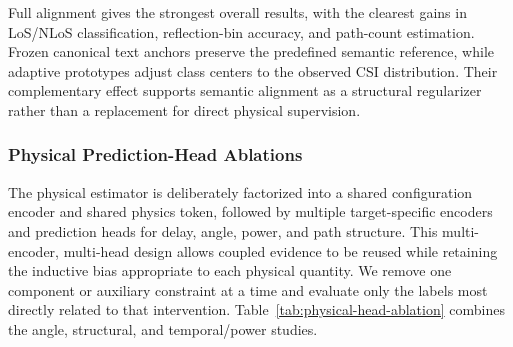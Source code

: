 Full alignment gives the strongest overall results, with the clearest gains in LoS/NLoS
classification, reflection-bin accuracy, and path-count estimation. Frozen canonical text anchors
preserve the predefined semantic reference, while adaptive prototypes adjust class centers to the
observed CSI distribution. Their complementary effect supports semantic alignment as a structural
regularizer rather than a replacement for direct physical supervision.

\subsubsection{Physical Prediction-Head Ablations}

The physical estimator is deliberately factorized into a shared configuration encoder and shared
physics token, followed by multiple target-specific encoders and prediction heads for delay, angle,
power, and path structure. This multi-encoder, multi-head design allows coupled evidence to be reused
while retaining the inductive bias appropriate to each physical quantity. We remove one component or
auxiliary constraint at a time and evaluate only the labels most directly related to that intervention.
Table~\ref{tab:physical-head-ablation} combines the angle, structural, and temporal/power studies.

